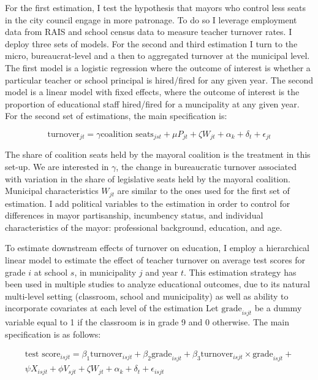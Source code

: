 \documentclass[12pt,a4paper]{article}
\begin{document}
For the first estimation, I test the hypothesis that mayors who control less seats in the city council engage in more patronage. To do so I leverage employment data from RAIS and school census data to measure teacher turnover rates. I deploy three sets of models. For the second and third estimation I turn to the micro, bureaucrat-level and a then to aggregated turnover at the municipal level. The first model is a logistic regression where the outcome of interest is whether a particular teacher or school principal is hired/fired for any given year. The second model is a linear model with fixed effects, where the outcome of interest is the proportion of educational staff hired/fired for a muncipality at any given year. For the second set of estimations, the main specification is:

$$\text{turnover}_{jt} = \gamma \text{coalition seats}_{jst} + \mu P_{jt} + \zeta W_{jt}+ \alpha_k + \delta_t + \epsilon_{jt}$$

The share of coalition seats held by the mayoral coalition is the treatment in this set-up. We are interested in $\gamma$, the change in bureaucratic turnover associated with variation in the share of legislative seats held by the mayoral coalition. Municipal characteristics $W_{jt}$ are similar to the ones used for the first set of estimation. I add political variables to the estimation in order to control for differences in mayor partisanship, incumbency status, and individual characteristics of the mayor: professional background, education, and age.

To estimate downstream effects of turnover on education, I employ a hierarchical linear model to estimate the effect of teacher turnover on average test scores for grade $i$ at school $s$, in municipality $j$ and year $t$. This estimation strategy has been used in multiple studies to analyze educational outcomes, due to its natural multi-level setting (classroom, school and municipality) as well as ability to incorporate covariates at each level of the estimation \citep{diprete_multilevel_1994, lee_using_2000} Let $\text{grade}_{isjt}$ be a dummy variable equal to 1 if the classroom is in grade 9 and 0 otherwise. The main specification is as follows:

\begin{align*}
\text{test score}_{isjt} = \beta_1 \text{turnover}_{isjt} + \beta_2 \text{grade}_{isjt} +\beta_3 \text{turnover}_{isjt} \times \text{grade}_{isjt} + \\ 
\psi X_{isjt} + \phi V_{sjt} +\zeta W_{jt}+ \alpha_k + \delta_t + \epsilon_{isjt}
\end{align*}
\end{document}
